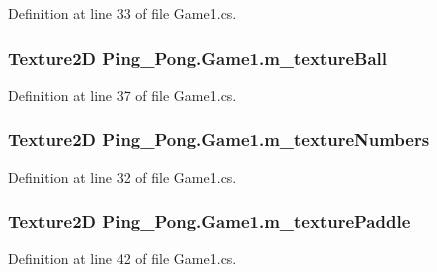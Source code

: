Definition at line 33 of file Game1.\-cs.

\hypertarget{class_ping___pong_1_1_game1_aeb0aebe72aa99d1d627260de5d1beafb}{
\subsubsection[{m\-\_\-texture\-Ball}]{\setlength{\rightskip}{0pt plus 5cm}Texture2\-D Ping\-\_\-\-Pong.\-Game1.\-m\-\_\-texture\-Ball\hspace{0.3cm}{\ttfamily [private]}}}\label{class_ping___pong_1_1_game1_aeb0aebe72aa99d1d627260de5d1beafb}


Definition at line 37 of file Game1.\-cs.

\hypertarget{class_ping___pong_1_1_game1_a7919de4eb9687284ff736962adc6d180}{
\subsubsection[{m\-\_\-texture\-Numbers}]{\setlength{\rightskip}{0pt plus 5cm}Texture2\-D Ping\-\_\-\-Pong.\-Game1.\-m\-\_\-texture\-Numbers\hspace{0.3cm}{\ttfamily [private]}}}\label{class_ping___pong_1_1_game1_a7919de4eb9687284ff736962adc6d180}


Definition at line 32 of file Game1.\-cs.

\hypertarget{class_ping___pong_1_1_game1_a2b0b61d9c93d9d11781d2d4a3c6f50d4}{
\subsubsection[{m\-\_\-texture\-Paddle}]{\setlength{\rightskip}{0pt plus 5cm}Texture2\-D Ping\-\_\-\-Pong.\-Game1.\-m\-\_\-texture\-Paddle\hspace{0.3cm}{\ttfamily [private]}}}\label{class_ping___pong_1_1_game1_a2b0b61d9c93d9d11781d2d4a3c6f50d4}


Definition at line 42 of file Game1.\-cs.


